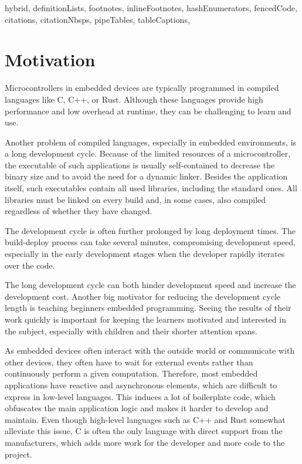\begin{markdown*}{%
  hybrid,
  definitionLists,
  footnotes,
  inlineFootnotes,
  hashEnumerators,
  fencedCode,
  citations,
  citationNbsps,
  pipeTables,
  tableCaptions,
}

\chapter{Motivation}

Microcontrollers in embedded devices are typically programmed in compiled languages like C, C++, or Rust. Although these languages provide high performance and low overhead at runtime, they can be challenging to learn and use.

Another problem of compiled languages, especially in embedded environments, is a long development cycle. Because of the limited resources of a microcontroller, the executable of such applications is usually self-contained to decrease the binary size and to avoid the need for a dynamic linker. Besides the application itself, such executables contain all used libraries, including the standard ones. All libraries must be linked on every build and, in some cases, also compiled regardless of whether they have changed.

The development cycle is often further prolonged by long deployment times. The build-deploy process can take several minutes, compromising development speed, especially in the early development stages when the developer rapidly iterates over the code.

The long development cycle can both hinder development speed and increase the development cost. Another big motivator for reducing the development cycle length is teaching beginners embedded programming. Seeing the results of their work quickly is important for keeping the learners motivated and interested in the subject, especially with children and their shorter attention spans.

As embedded devices often interact with the outside world or communicate with other devices, they often have to wait for external events rather than continuously perform a given computation. Therefore, most embedded applications have reactive and asynchronous elements, which are difficult to express in low-level languages. This induces a lot of boilerplate code, which obfuscates the main application logic and makes it harder to develop and maintain. Even though high-level languages such as C++ and Rust somewhat alleviate this issue, C is often the only language with direct support from the manufacturers, which adds more work for the developer and more code to the project.



\end{markdown*}
